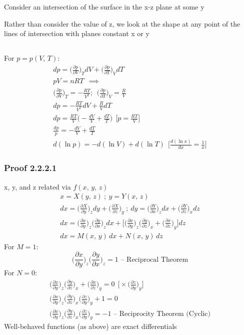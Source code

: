 \documentclass[a4paper, 11pt, normalem]{report}
\newcommand\p{\partial}
\begin{document}
Consider an intersection of the surface in the x-z plane at some y

Rather than consider the value of z, we look at the shape at any point of the lines of intersection with planes constant x or y

\subsection{}
For $p = p(V,\,T)$:
\begin{gather*}
    dp = \Big(\frac{\p p}{\p V}\Big)_T dV + \Big(\frac{\p p}{\p T}\Big)_V dT \\
    pV = nRT ~~\implies \\
    \Big(\frac{\p p}{\p V}\Big)_T = -\frac{RT}{V^2};~~ \Big(\frac{\p p}{\p T}\Big)_V = \frac{R}{V} \\
    dp = -\frac{RT}{V^2}dV + \frac{R}{V}dT \\
    dp = \frac{RT}{V}\Big(- \frac{dV}{V} + \frac{dT}{T}\Big)~~ \Big[p = \frac{RT}{V}\Big] \\
    \frac{dp}{p} = - \frac{dV}{V} + \frac{dT}{T} \\
    d(\ln{p}) = -d(\ln{V}) + d(\ln{T})~~ \Big[\frac{d(\ln{x})}{dx} = \frac{1}{x} \Big]
\end{gather*}

\subsubsection{Proof 2.2.2.1}
x, y, and z related via $f(x,\,y,\,z)$
\begin{gather*}
    x = X(y,\,z)~;~ y = Y(x,\,z) \\
    dx = \Big(\frac{\p X}{\p y} \Big)_z dy + \Big(\frac{\p X}{\p z} \Big)_y ~;~ dy = \Big(\frac{\p Y}{\p x} \Big)_z dx + \Big(\frac{\p Y}{\p z} \Big)_x dz \\
    dx = \Big(\frac{\p x}{\p y} \Big)_z \Big(\frac{\p y}{\p x} \Big)_z dx + \Bigg[\Big(\frac{\p x}{\p y} \Big)_z \Big(\frac{\p y}{\p z} \Big)_x + \Big(\frac{\p x}{\p z} \Big)_y \Bigg] dz \\
    dx = M(x,\,y)\,dx + N(x,\,y)\,dz
\end{gather*}
For $M = 1$:
\begin{equation*}
    \Big(\frac{\p x}{\p y} \Big)_z \Big(\frac{\p y}{\p x} \Big)_z = 1 \text{ -- Reciprocal Theorem}
\end{equation*}
For $N = 0$:
\begin{gather*}
    \Big(\frac{\p x}{\p y} \Big)_z \Big(\frac{\p y}{\p z} \Big)_x + \Big(\frac{\p x}{\p z} \Big)_y = 0 ~~ \Bigg[ \times \Big(\frac{\p z}{\p y} \Big)_y \Bigg] \\
    \Big(\frac{\p x}{\p y} \Big)_z \Big(\frac{\p y}{\p z} \Big)_x \Big(\frac{\p z}{\p y} \Big)_y + 1 = 0 \\
    \Big(\frac{\p x}{\p y} \Big)_z \Big(\frac{\p y}{\p z} \Big)_x \Big(\frac{\p z}{\p y} \Big)_y = -1 \text{ -- Reciprocity Theorem (Cyclic)}
\end{gather*}
Well-behaved functions (as above) are exact differentials
\end{document}
